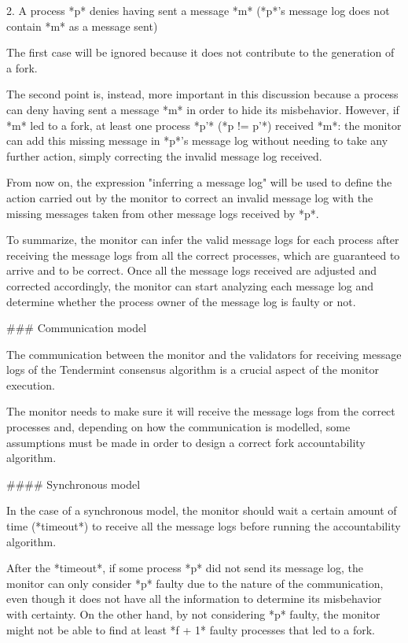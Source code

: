 \documentclass[a4paper,11pt,oneside]{report}
\begin{document}
\begin{markdown}
2. A process *p* denies having sent a message *m* (*p*'s message log does not contain *m* as a message sent) 

The first case will be ignored because it does not contribute to the generation of a fork.

The second point is, instead, more important in this discussion because a process can deny having sent a message *m* in order to hide its misbehavior. 
However, if *m* led to a fork, at least one process *p'* (*p != p'*) received *m*: the monitor can add this missing message in *p*'s message log without needing to take any further action, simply correcting the invalid message log received. 

From now on, the expression "inferring a message log" will be used to define the action carried out by the monitor to correct an invalid message log with the missing messages taken from other message logs received by *p*.

To summarize, the monitor can infer the valid message logs for each process after receiving the message logs from all the correct processes, which are guaranteed to arrive and to be correct.
Once all the message logs received are adjusted and corrected accordingly, the monitor can start analyzing each message log and determine whether the process owner of the message log is faulty or not.

### Communication model

The communication between the monitor and the validators for receiving message logs of the Tendermint consensus algorithm is a crucial aspect of the monitor execution.

The monitor needs to make sure it will receive the message logs from the correct processes and, depending on how the communication is modelled, some assumptions must be made in order to design a correct fork accountability algorithm.

#### Synchronous model

In the case of a synchronous model, the monitor should wait a certain amount of time (*timeout*) to receive all the message logs before running the accountability algorithm.

After the *timeout*, if some process *p* did not send its message log, the monitor can only consider *p* faulty due to the nature of the communication, even though it does not have all the information to determine its misbehavior with certainty. 
On the other hand, by not considering *p* faulty, the monitor might not be able to find at least *f + 1* faulty processes that led to a fork.


\end{markdown}
\end{document}
